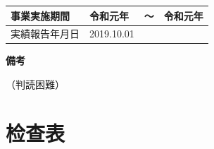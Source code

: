 \documentclass[UTF8,10pt,a4paper,fontset=fandol]{ctexart}
\newcommand{\fieldvalue}[1]{#1}
\newcommand{\handwritten}[1]{#1}
\begin{document}
\vspace{3mm}

\noindent
\begin{tabularx}{\textwidth}{|l|X|l|X|}
\hline
事業実施期間 & 
\fieldvalue{\handwritten{令和元年}} & ～ &
\fieldvalue{\handwritten{令和元年}} \\
\hline
実績報告年月日 &
\fieldvalue{\handwritten{2019.10.01}} &  & \\
\hline
\end{tabularx}

\vspace{3mm}

\noindent
\textbf{備考}

\noindent
\fieldvalue{\handwritten{（判読困難）}}


\newpage

\section*{检查表}

\end{document}
